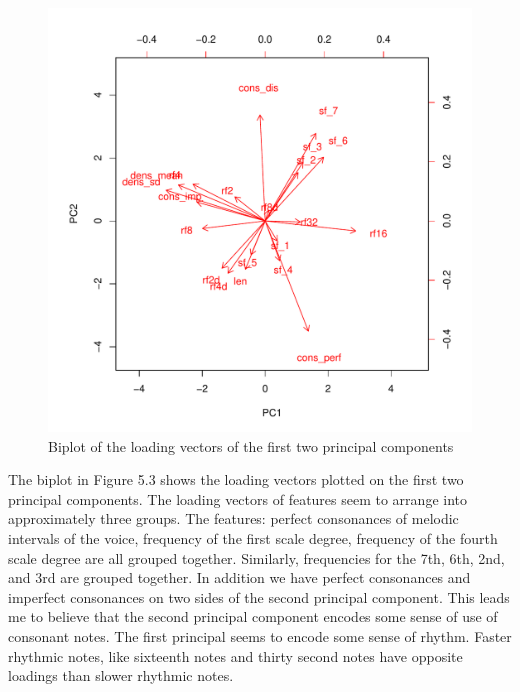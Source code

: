 \documentclass[12pt,twoside]{reedthesis}
\theoremstyle{definition}
\theoremstyle{definition}
\theoremstyle{definition}
\theoremstyle{remark}
\begin{document}
\begin{figure}[H]
\centering
\includegraphics[scale = .5]{images/biplot_b.pdf}
\caption{Biplot of the loading vectors of the first two principal components}
\label{subd}
\end{figure}
The biplot in Figure 5.3 shows the loading vectors plotted on the first
two principal components. The loading vectors of features seem to
arrange into approximately three groups. The features: perfect
consonances of melodic intervals of the voice, frequency of the first
scale degree, frequency of the fourth scale degree are all grouped
together. Similarly, frequencies for the 7th, 6th, 2nd, and 3rd are
grouped together. In addition we have perfect consonances and imperfect
consonances on two sides of the second principal component. This leads
me to believe that the second principal component encodes some sense of
use of consonant notes. The first principal seems to encode some sense
of rhythm. Faster rhythmic notes, like sixteenth notes and thirty second
notes have opposite loadings than slower rhythmic notes.
\end{document}
